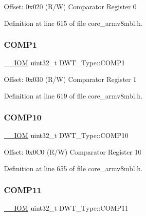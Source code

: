 Offset\+: 0x020 (R/W) Comparator Register 0 

Definition at line 615 of file core\+\_\+armv8mbl.\+h.

\mbox{\label{struct_d_w_t___type_a38714af6b7fa7c64d68f5e1efbe7a931}} 
\subsubsection{\texorpdfstring{C\+O\+M\+P1}{COMP1}}
{\footnotesize\ttfamily \hyperlink{core__sc300_8h_ab6caba5853a60a17e8e04499b52bf691}{\+\_\+\+\_\+\+I\+OM} uint32\+\_\+t D\+W\+T\+\_\+\+Type\+::\+C\+O\+M\+P1}

Offset\+: 0x030 (R/W) Comparator Register 1 

Definition at line 619 of file core\+\_\+armv8mbl.\+h.

\mbox{\label{struct_d_w_t___type_acf26842434e5cd1487a49812ec842d03}} 
\subsubsection{\texorpdfstring{C\+O\+M\+P10}{COMP10}}
{\footnotesize\ttfamily \hyperlink{core__sc300_8h_ab6caba5853a60a17e8e04499b52bf691}{\+\_\+\+\_\+\+I\+OM} uint32\+\_\+t D\+W\+T\+\_\+\+Type\+::\+C\+O\+M\+P10}

Offset\+: 0x0\+C0 (R/W) Comparator Register 10 

Definition at line 655 of file core\+\_\+armv8mbl.\+h.

\mbox{\label{struct_d_w_t___type_aa199b91c854edd21ded38b8922d1e2a7}} 
\subsubsection{\texorpdfstring{C\+O\+M\+P11}{COMP11}}
{\footnotesize\ttfamily \hyperlink{core__sc300_8h_ab6caba5853a60a17e8e04499b52bf691}{\+\_\+\+\_\+\+I\+OM} uint32\+\_\+t D\+W\+T\+\_\+\+Type\+::\+C\+O\+M\+P11}

